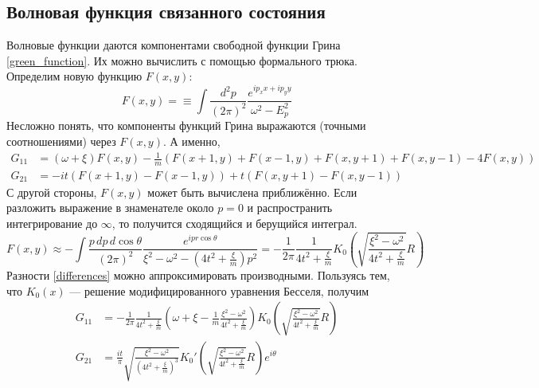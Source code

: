 \subsection{Волновая функция связанного состояния}
Волновые функции даются компонентами свободной функции Грина \eqref{green_function}.
Их можно вычислить с помощью формального трюка. Определим новую функцию
$F(x,y)$:
\begin{equation}
    F(x,y) = \equiv \int \frac{d^2 p}{(2\pi)^2} 
            \frac{e^{ip_x x + ip_y y}}{\omega^2 - E_p^2} 
\end{equation}
Несложно понять, что компоненты функций Грина выражаются (точными соотношениями)
 через $F(x,y)$. А именно,
\begin{equation}
    \label{differences}
    \begin{split}
        G_{11} & = (\omega + \xi) F(x,y) - 
            \frac{1}{m}(F(x+1,y) + F(x-1,y) + F(x,y+1) + F(x, y-1) - 4F(x,y))\\
        G_{21} & = -it(F(x+1,y) - F(x-1,y)) + t(F(x,y+1) - F(x,y-1))
    \end{split}
\end{equation}
С другой стороны, $F(x,y)$ может быть вычислена приближённо. Если разложить 
выражение в знаменателе около $p = 0$ и распространить интегрирование до $\infty$, то получится
сходящийся и берущийся интеграл.
\begin{equation}
    F(x,y) \approx -\int \frac{p\,dp\,d\cos{\theta}}{(2\pi)^2} 
        \frac{e^{ipr\cos{\theta}}}{\xi^2 - \omega^2 - (4t^2 + \frac{\xi}{m})p^2} = 
        -\frac{1}{2\pi} \frac{1}{4t^2 + \frac{\xi}{m}}
        K_0 \left(\sqrt{\frac{\xi^2 - \omega^2}{4t^2 + \frac{\xi}{m}}}R \right)
\end{equation}
Разности \eqref{differences} можно аппроксимировать производными. Пользуясь тем, что
$K_0(x)$ --- решение модифицированного уравнения Бесселя, получим 
\begin{equation}
    \begin{split}
        G_{11} & = -\frac{1}{2\pi} \frac{1}{4t^2 + \frac{\xi}{m}}
        \left( \omega + \xi - \frac{1}{m} \frac{\xi^2 - \omega^2}{4t^2 + \frac{\xi}{m}} \right)
        K_0 \left(\sqrt{\frac{\xi^2 - \omega^2}{4t^2 + \frac{\xi}{m}}}R \right)\\
        G_{21} & = \frac{it}{\pi} \sqrt{\frac{\xi^2 - \omega^2}
                                     {(4t^2 + \frac{\xi}{m})^{3}}}
        K_0' \left(\sqrt{\frac{\xi^2 - \omega^2}{4t^2 + \frac{\xi}{m}}}R \right)e^{i\theta}
    \end{split}
\end{equation}
